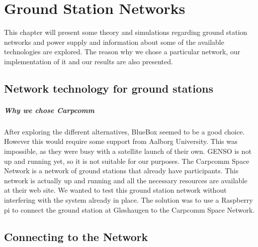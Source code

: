 \chapter{Ground Station Networks}

This chapter will present some theory and simulations regarding ground station networks and power supply and information about some of the available technologies are explored. The reason why we chose a particular network, our implementation of it and our results are also presented. 





\section{Network technology for ground stations}





\paragraph{Why we chose Carpcomm}
After exploring the different alternatives, BlueBox seemed to be a good choice. However this would require some support from Aalborg University. This was impossible, as they were busy with a satellite launch of their own. GENSO is not up and running yet, so it is not suitable for our purposes. The Carpcomm Space Network is a network of ground stations that already have participants. This network is actually up and running and all the necessary resources are available at their web site. We wanted to test this ground station network without interfering with the system already in place. The solution was to use a Raspberry pi to connect the ground station at Gløshaugen to the Carpcomm Space Network.
 


\section {Connecting to the Network}

